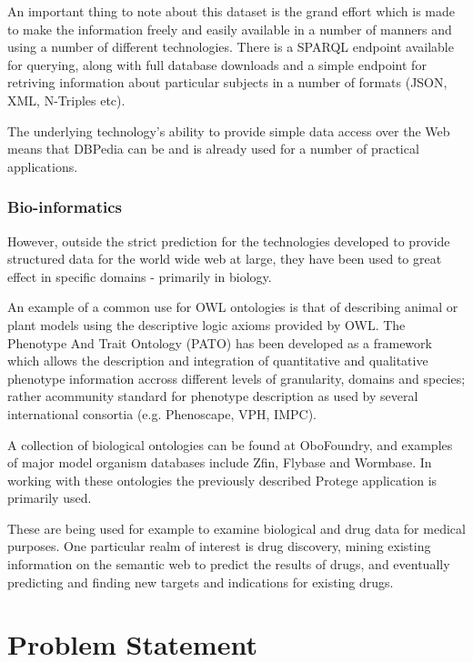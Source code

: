 \documentclass{article}
\begin{document}
An important thing to note about this dataset is the grand effort which is made
to make the information freely and easily available in a number of manners and
using a number of different technologies. There is a SPARQL endpoint available
for querying, along with full database downloads and a simple endpoint for
retriving information about particular subjects in a number of formats (JSON,
XML, N-Triples etc).

The underlying technology's ability to provide simple data access over the Web
means that DBPedia can be and is already used for a number of practical
applications.\cite{dbpedia-uses}

\subsubsection{Bio-informatics}

However, outside the strict prediction for the technologies developed to provide
structured data for the world wide web at large, they have been used to great
effect in specific domains - primarily in biology.

An example of a common use for OWL ontologies is that of describing animal or
plant models using the descriptive logic axioms provided by OWL. The Phenotype
And Trait Ontology (PATO) has been developed as a framework which allows the
description and integration of quantitative and qualitative phenotype
information accross different levels of granularity, domains and
species\cite{pato}; rather acommunity standard for phenotype description as
used by several international consortia (e.g. Phenoscape\cite{phenoscape},
VPH\cite{vph}, IMPC\cite{impc}).

A collection of biological ontologies can be found at
OboFoundry\cite{obofoundry}, and examples of major model organism databases
include Zfin\cite{zfin}, Flybase\cite{flybase} and Wormbase\cite{wormbase}. In working with
these ontologies the previously described Protege application is primarily used. 

These are being used for example to examine biological and drug data for medical
purposes\cite{humontology}. One particular realm of interest is drug discovery,
mining existing information on the semantic web to predict the results of drugs,
and eventually predicting and finding new targets and indications for existing
drugs\cite{semwebdiscovery}.

\section{Problem Statement}
\end{document}

